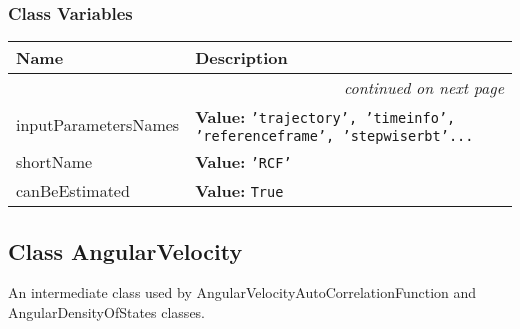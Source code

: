 
  \subsubsection{Class Variables}

    \vspace{-1cm}
\hspace{\varindent}\begin{longtable}{|p{\varnamewidth}|p{\vardescrwidth}|l}
\cline{1-2}
\cline{1-2} \centering \textbf{Name} & \centering \textbf{Description}& \\
\cline{1-2}
\endhead\cline{1-2}\multicolumn{3}{r}{\small\textit{continued on next page}}\\\endfoot\cline{1-2}
\endlastfoot\raggedright i\-n\-p\-u\-t\-P\-a\-r\-a\-m\-e\-t\-e\-r\-s\-N\-a\-m\-e\-s\- & \raggedright \textbf{Value:} 
{\tt 'trajectory', 'timeinfo', 'referenceframe', 'stepwiserbt'\texttt{...}}&\\
\cline{1-2}
\raggedright s\-h\-o\-r\-t\-N\-a\-m\-e\- & \raggedright \textbf{Value:} 
{\tt 'RCF'}&\\
\cline{1-2}
\raggedright c\-a\-n\-B\-e\-E\-s\-t\-i\-m\-a\-t\-e\-d\- & \raggedright \textbf{Value:} 
{\tt True}&\\
\cline{1-2}
\end{longtable}



\subsection{Class AngularVelocity}

    \label{nMOLDYN:Analysis:Dynamics:AngularVelocity}
An intermediate class used by 
{\textbar}AngularVelocityAutoCorrelationFunction{\textbar} and 
{\textbar}AngularDensityOfStates{\textbar} classes.


